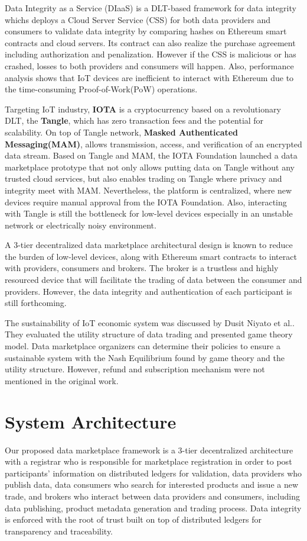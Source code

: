 \documentclass[journal,10pt,a4paper]{IEEEtran}
\begin{document}
Data Integrity as a Service (DIaaS)\cite{DIaas} is a DLT-based framework for data integrity whichs deploys a Cloud Server Service (CSS) for both data providers and consumers to validate data integrity by comparing hashes on Ethereum smart contracts\cite{smartContract} and cloud servers. Its contract can also realize the purchase agreement including authorization and penalization. However if the CSS is malicious or has crashed, losses to both providers and consumers will happen. Also, performance analysis shows that IoT devices are inefficient to interact with Ethereum due to the time-consuming Proof-of-Work(PoW) operations.

Targeting IoT industry, \textbf{IOTA}\cite{IOTAwhitepaper} is a cryptocurrency based on a revolutionary DLT, the \textbf{Tangle}, which has zero transaction fees and the potential for scalability. On top of Tangle network, \textbf{Masked Authenticated Messaging(MAM)}\cite{MAM}, allows transmission, access, and verification of an encrypted data stream. Based on Tangle and MAM, the IOTA Foundation launched a data marketplace\cite{IOTADataMarket} prototype that not only allows putting data on Tangle without any trusted cloud services, but also enables trading on Tangle where privacy and integrity meet with MAM. Nevertheless, the platform is centralized, where new devices require manual approval from the IOTA Foundation. Also, interacting with Tangle is still the bottleneck for low-level devices especially in an unstable network or electrically noisy environment.

A 3-tier decentralized data marketplace architectural design\cite{3tierDataMarket} is known to reduce the burden of low-level devices, along with Ethereum smart contracts to interact with providers, consumers and brokers. The broker is a trustless and highly resourced device that will facilitate the trading of data between the consumer and providers. However, the data integrity and authentication of each participant is still forthcoming.

The sustainability of IoT economic system was discussed by Dusit Niyato et al.\cite{UtilityStruct}. They evaluated the utility structure of data trading and presented game theory model.  Data marketplace organizers can determine their policies to ensure a sustainable system with the Nash Equilibrium found by game theory and the utility structure. However, refund and subscription mechanism were not mentioned in the original work.

\section{\normalsize\textbf{System Architecture}}
Our proposed data marketplace framework is a 3-tier decentralized architecture with a registrar who is responsible for marketplace registration in order to post participants' information on distributed ledgers for validation, data providers who publish data, data consumers who search for interested products and issue a new trade, and brokers who interact between data providers and consumers, including data publishing, product metadata generation and trading process.  Data integrity is enforced with the root of trust built on top of distributed ledgers for transparency and traceability.
\end{document}

